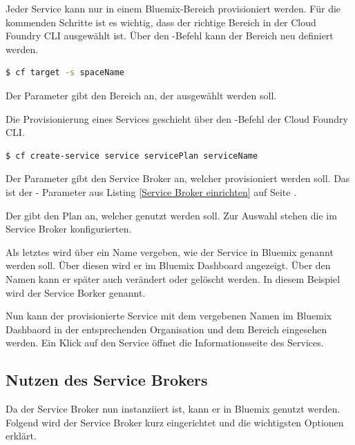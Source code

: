 Jeder Service kann nur in einem Bluemix-Bereich provisioniert werden. Für die kommenden Schritte ist es wichtig,
dass der richtige Bereich in der Cloud Foundry CLI ausgewählt ist. Über den -Befehl kann der Bereich
neu definiert werden.

\begin{lstlisting}[language=bash, caption=Bereich (Space) in Cloud Foundry CLI wechseln, label=Bereich (Space) in Cloud Foundry CLI wechseln]
   $ cf target -s spaceName
\end{lstlisting}

Der Parameter  gibt den Bereich an, der ausgewählt werden soll.

Die Provisionierung eines Services geschieht über den -Befehl der Cloud Foundry CLI.

\begin{lstlisting}[language=bash, caption=Provisionieren eines Services, label=Provisionieren eines Services]
   $ cf create-service service servicePlan serviceName
\end{lstlisting}

Der Parameter  gibt den Service Broker an, welcher provisioniert werden soll. Das ist der -
Parameter aus Listing \ref{Service Broker einrichten} auf Seite \pageref{Service Broker einrichten}.

Der  gibt den Plan an, welcher genutzt werden soll. Zur Auswahl stehen die im Service Broker
konfigurierten.

Als letztes wird über  ein Name vergeben, wie der Service in Bluemix genannt werden soll. Über diesen
wird er im Bluemix Dashboard angezeigt. Über den Namen kann er später auch verändert oder gelöscht werden. In diesem Beispiel
wird der Service Borker  genannt.

Nun kann der provisionierte Service mit dem vergebenen Namen im Bluemix Dashbaord in der entsprechenden Organisation und
dem Bereich eingesehen werden. Ein Klick auf den Service öffnet die Informationsseite des Services.

\subsection{Nutzen des Service Brokers}
Da der Service Broker nun instanziiert ist, kann er in Bluemix genutzt werden. Folgend wird der Service Broker kurz
eingerichtet und die wichtigsten Optionen erklärt.


